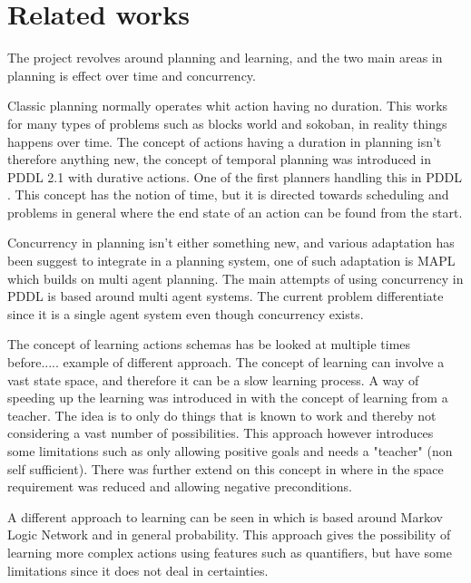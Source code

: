 \section{Related works}
The project revolves around planning and learning, and the two main areas in planning is effect over time and concurrency. 

Classic planning normally operates whit action having no duration. This works for many types of problems such as blocks world and sokoban, in reality things happens over time. The concept of actions having a duration in planning isn't therefore anything new, the concept of temporal planning was introduced in PDDL 2.1 with durative actions. One of the first planners handling this in PDDL \cite{durative}. This concept has the notion of time, but it is directed towards scheduling and problems in general where the end state of an action can be found from the start.
%
%	
%
%	
%	




Concurrency in planning isn't either something new, and various adaptation has been suggest to integrate in a planning system, one of such adaptation is MAPL which builds on multi agent planning\cite{mapl}. The main attempts of using concurrency in PDDL is based around multi agent systems. The current problem differentiate since it is a single agent system even though concurrency exists. 

The concept of learning actions schemas has be looked at multiple times before..... example of different approach.
The concept of learning can involve a vast state space, and therefore it can be a slow learning process. A way of speeding up the learning was introduced in \cite{Action-Schemas} with the concept of learning from a teacher. The idea is to only do things that is known to work and thereby not considering a vast number of possibilities. This approach however introduces some limitations such as only allowing positive goals and needs a "teacher" (non self sufficient). There was further extend on this concept in \cite{jacobsen2015a} where in the space requirement was reduced and allowing negative preconditions.

A different approach to learning can be seen in \cite{zhuo2010a} which is based around Markov Logic Network and in general probability. This approach gives the possibility of learning more complex actions using features such as quantifiers, but have some limitations since it does not deal in certainties.
